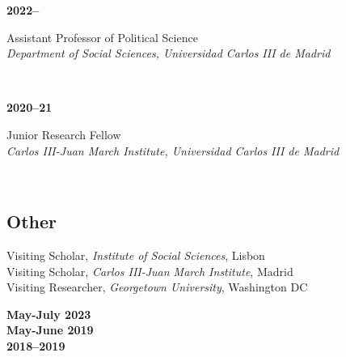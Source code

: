 \documentclass[a4paper, 12pt]{article}
\begin{document}
\begin{minipage}[t]{0.12\textwidth}
\textbf{2022--}
\end{minipage}\hfill\begin{minipage}[t]{0.88\textwidth}
Assistant Professor of Political Science\\
\textit{Department of Social Sciences, Universidad Carlos III de Madrid}\\\vspace{-8pt}
\end{minipage}\\
\begin{minipage}[t]{0.12\textwidth}
\textbf{2020--21}
\end{minipage}\hfill\begin{minipage}[t]{0.88\textwidth}
Junior Research Fellow\\
\textit{Carlos III-Juan March Institute, Universidad Carlos III de Madrid}\\\vspace{-8pt}
\end{minipage}\\

\vspace{-10pt}
\subsection*{Other}

\begin{minipage}[t]{0.82\textwidth}
  Visiting Scholar, \textit{Institute of Social Sciences}, Lisbon\vspace{2pt}\\
  Visiting Scholar, \textit{Carlos III-Juan March Institute}, Madrid\vspace{2pt}\\
	Visiting Researcher, \textit{Georgetown University}, Washington DC
\end{minipage}
\begin{minipage}[t]{0.18\textwidth}
  \flushright
	\textbf{May-July 2023}\\\vspace{7pt}
  \textbf{May-June 2019}\\\vspace{7pt}
	\textbf{2018--2019}
\end{minipage}
\end{document}
